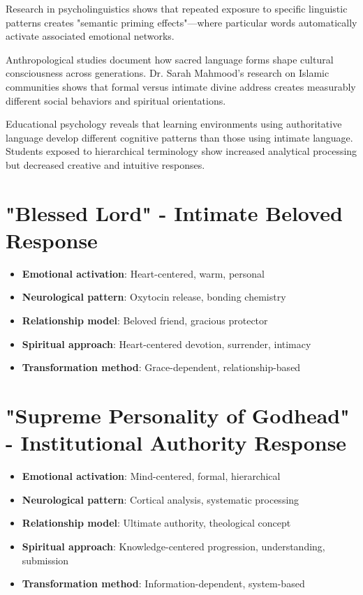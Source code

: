 \documentclass[11pt,twoside]{book}
\begin{document}
Research in psycholinguistics shows that repeated exposure to specific linguistic patterns creates "semantic priming effects"—where particular words automatically activate associated emotional networks.

Anthropological studies document how sacred language forms shape cultural consciousness across generations. Dr. Sarah Mahmood's research on Islamic communities shows that formal versus intimate divine address creates measurably different social behaviors and spiritual orientations.

Educational psychology reveals that learning environments using authoritative language develop different cognitive patterns than those using intimate language. Students exposed to hierarchical terminology show increased analytical processing but decreased creative and intuitive responses.
\section*{"Blessed Lord" - Intimate Beloved Response}
\label{sec:org913a36f}
\begin{itemize}
\item \textbf{\textbf{Emotional activation}}: Heart-centered, warm, personal
\item \textbf{\textbf{Neurological pattern}}: Oxytocin release, bonding chemistry
\item \textbf{\textbf{Relationship model}}: Beloved friend, gracious protector
\item \textbf{\textbf{Spiritual approach}}: Heart-centered devotion, surrender, intimacy
\item \textbf{\textbf{Transformation method}}: Grace-dependent, relationship-based
\end{itemize}
\section*{"Supreme Personality of Godhead" - Institutional Authority Response}
\label{sec:orgfd53090}
\begin{itemize}
\item \textbf{\textbf{Emotional activation}}: Mind-centered, formal, hierarchical
\item \textbf{\textbf{Neurological pattern}}: Cortical analysis, systematic processing
\item \textbf{\textbf{Relationship model}}: Ultimate authority, theological concept
\item \textbf{\textbf{Spiritual approach}}: Knowledge-centered progression, understanding, submission
\item \textbf{\textbf{Transformation method}}: Information-dependent, system-based
\end{itemize}
\end{document}
